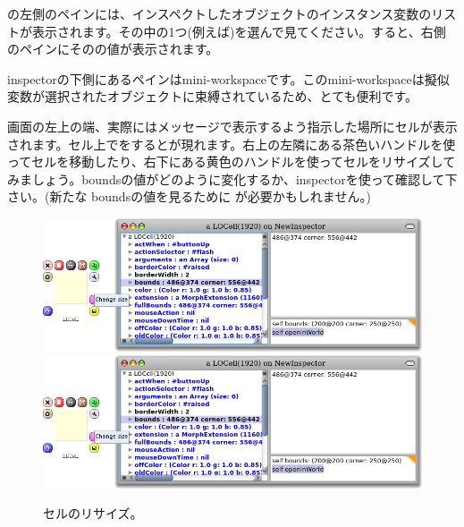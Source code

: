 \documentclass[a4paper,10pt,twoside]{book}
\begin{document}
の左側のペインには、インスペクトしたオブジェクトのインスタンス変数のリストが表示されます。その中の1つ(例えば\mbox{})を選んで見てください。すると、右側のペインにそのの値が表示されます。


inspectorの下側にあるペインはmini-workspaceです。このmini-workspaceは擬似変数\self が選択されたオブジェクトに束縛されているため、とても便利です。


画面の左上の端、実際にはメッセージで表示するよう指示した場所にセルが表示されます。セル上で\metaclick をするとが現れます。右上の左隣にある茶色いハンドルを使ってセルを移動したり、右下にある黄色のハンドルを使ってセルをリサイズしてみましょう。boundsの値がどのように変化するか、inspectorを使って確認して下さい。(新たな boundsの値を見るために  \actclick が必要かもしれません。)

\begin{figure}[htbp]
\centering
\ifluluelse
	{\includegraphics[width=\textwidth]{LOCellResize} }
	{\includegraphics[scale=0.7]{LOCellResize} }
\caption{セルのリサイズ。}
\end{figure}
\end{document}
